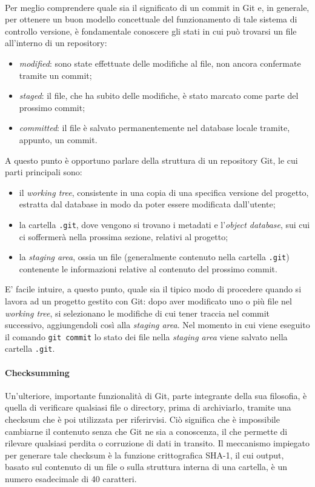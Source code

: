 \documentclass[12pt]{article}
\def\code#1{\texttt{#1}}
\begin{document}
\bigskip \\
Per meglio comprendere quale sia il significato di un commit in Git e, in generale, per ottenere un buon modello concettuale del funzionamento di tale sistema di controllo versione, è fondamentale conoscere gli stati in cui può trovarsi un file all'interno di un repository:
\begin{itemize}
	\item \textit{modified}: sono state effettuate delle modifiche al file, non ancora confermate tramite un commit;
	\item \textit{staged}: il file, che ha subito delle modifiche, è stato marcato come parte del prossimo commit;
	\item \textit{committed}: il file è salvato permanentemente nel database locale tramite, appunto, un commit.
\end{itemize}
A questo punto è opportuno parlare della struttura di un repository Git, le cui parti principali sono:
\begin{itemize}
	\item il \textit{working tree}, consistente in una copia di una specifica versione del progetto, estratta dal database in modo da poter essere modificata dall'utente;
	\item la cartella \code{.git}, dove vengono si trovano i metadati e l'\textit{object database}, sui cui ci soffermerà nella prossima sezione, relativi al progetto;
	\item la \textit{staging area}, ossia un file (generalmente contenuto nella cartella \code{.git}) contenente le informazioni relative al contenuto del prossimo commit.
\end{itemize}
E' facile intuire, a questo punto, quale sia il tipico modo di procedere quando si lavora ad un progetto gestito con Git: dopo aver modificato uno o più file nel \textit{working tree}, si selezionano le modifiche di cui tener traccia nel commit successivo, aggiungendoli così alla \textit{staging area}. Nel momento in cui viene eseguito il comando \code{git commit} lo stato dei file nella \textit{staging area} viene salvato nella cartella \code{.git}.
\paragraph{Checksumming}
Un'ulteriore, importante funzionalità di Git, parte integrante della sua filosofia, è quella di verificare qualsiasi file o directory, prima di archiviarlo, tramite una checksum che è poi utilizzata per riferirvisi. Ciò significa che è impossibile cambiarne il contenuto senza che Git ne sia a conoscenza, il che permette di rilevare qualsiasi perdita o corruzione di dati in transito. 
Il meccanismo impiegato per generare tale checksum è la funzione crittografica SHA-1, il cui output, basato sul contenuto di un file o sulla struttura interna di una cartella, è un numero esadecimale di 40 caratteri.
\end{document}
